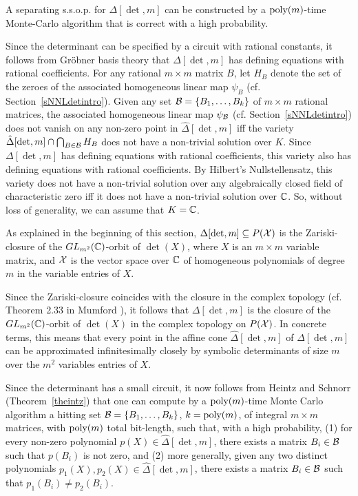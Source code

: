 \documentclass[11pt]{article}
\begin{document}
\begin{theorem} \label{tmontedet}
A separating  s.s.o.p.  for $\Delta[\det,m]$ 
can be constructed by  a ${\mbox {poly}}(m)$-time Monte-Carlo algorithm  that is correct with a high probability.
\end{theorem}
\proof 
Since the determinant can be specified by a circuit with rational constants,
it follows from Gr\"obner basis theory \cite{mayr2} that $\Delta[\det,m]$ has 
defining equations with rational coefficients. For any rational $m \times
m$ matrix $B$, let $H_B$ denote the set of the zeroes of 
the associated homogeneous linear map $\psi_B$ 
(cf. Section~\ref{sNNLdetintro}). 
Given any set ${\cal B}=\{B_1,\ldots,B_k\}$ of 
$m \times m$ rational matrices,  the associated homogeneous linear 
map $\psi_{\cal B}$  (cf. Section~\ref{sNNLdetintro}) does not vanish on 
any non-zero point in $\hat \Delta[\det,m]$ iff 
the variety 
$\hat \Delta[\det,m] \cap \bigcap_{B \in {\cal B}} H_B$ does not have a
non-trivial solution
over $K$. Since $\Delta[\det,m]$ has 
defining equations with rational coefficients,
this  variety also has defining equations 
with rational coefficients. 
By Hilbert's Nullstellensatz,  this variety does not have  a non-trivial
solution over any algebraically closed field of characteristic zero  iff it does not 
have a non-trivial solution over $\mathbb{C}$. 
So, without loss of generality, we can assume that $K=\mathbb{C}$. 

As explained in the beginning of this section,  $\Delta[\det,m] \subseteq P({\cal X})$ is the Zariski-closure 
of the $GL_{m^2}(\mathbb{C})$-orbit of $\det(X)$, where $X$ is an $m\times m$ variable matrix, and 
${\cal X}$ is  the vector space over $\mathbb{C}$ of homogeneous polynomials of degree $m$ in the 
variable entries of $X$.

Since the Zariski-closure coincides with the closure in the complex topology (cf. Theorem 2.33 in Mumford \cite{mumfordalg}),
it follows that $\Delta[\det,m]$ is the closure 
of the $GL_{m^2}(\mathbb{C})$-orbit of $\det(X)$ in the complex topology on $P({\cal X})$. 
In concrete terms, this means that every point in the affine cone $\hat \Delta[\det,m]$ of $\Delta[\det,m]$ can be approximated 
infinitesimally closely by  symbolic determinants of size $m$ over the $m^2$ variables  entries of $X$.

Since the determinant has a small circuit, it now follows from Heintz and Schnorr (Theorem~\ref{theintz}) that one can compute 
by a  ${\mbox {poly}}(m)$-time Monte Carlo algorithm
a hitting set ${\cal B}=\{B_1, \ldots, B_k\}$, $k={\mbox {poly}}(m)$,  of  integral $m\times m$ 
matrices, with ${\mbox {poly}}(m)$ total bit-length,  such that, with a high probability,  (1) for every non-zero polynomial $p(X) \in
\hat \Delta[\det,m]$, there exists a  matrix $B_i \in {\cal B}$ such that $p(B_i)$ is not zero,
and (2) more generally, given any two distinct polynomials $p_1(X), p_2(X) 
\in \hat \Delta[\det,m]$, there exists a matrix $B_i \in {\cal B}$ such that 
$p_1(B_i) \not = p_2(B_i)$. 
\end{document}

